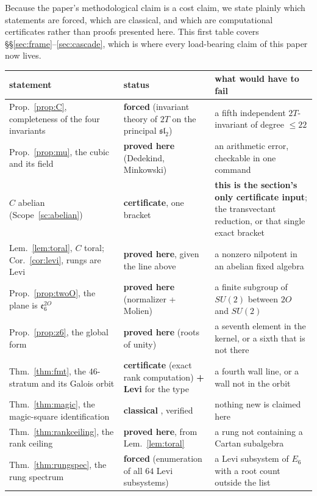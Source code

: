 \documentclass[11pt,reqno]{amsart}
\theoremstyle{plain}
\theoremstyle{definition}
\theoremstyle{remark}
\newcommand{\sll}{\mathfrak{sl}}
\newcommand{\ee}{\mathfrak{e}}
\begin{document}
Because the paper's methodological claim is a cost claim, we state plainly which
statements are forced, which are classical, and which are computational certificates
rather than proofs presented here. This first table covers
\S\S\ref{sec:frame}--\ref{sec:cascade}, which is where every load-bearing claim of
this paper now lives.

\begin{table}[h]
\centering\small
\begin{tabular}{@{}p{}p{}p{}@{}}
\toprule
statement & status & what would have to fail\\
\midrule
Prop.~\ref{prop:C}, completeness of the four invariants
 & \textbf{forced} (invariant theory of $2T$ on the principal $\sll_2$)
 & a fifth independent $2T$-invariant of degree $\le22$\\
Prop.~\ref{prop:mu}, the cubic and its field
 & \textbf{proved here} (Dedekind, Minkowski)
 & an arithmetic error, checkable in one command\\
$C$ abelian (Scope~\ref{sc:abelian})
 & \textbf{certificate}, one bracket
 & \textbf{this is the section's only certificate input}; the
   transvectant reduction, or that single exact bracket\\
Lem.~\ref{lem:toral}, $C$ toral; Cor.~\ref{cor:levi}, rungs are Levi
 & \textbf{proved here}, given the line above
 & a nonzero nilpotent in an abelian fixed algebra\\
Prop.~\ref{prop:twoO}, the plane is $\ee_6^{2O}$
 & \textbf{proved here} (normalizer + Molien)
 & a finite subgroup of $SU(2)$ between $2O$ and $SU(2)$\\
Prop.~\ref{prop:z6}, the global form
 & \textbf{proved here} (roots of unity)
 & a seventh element in the kernel, or a sixth that is not there\\
Thm.~\ref{thm:fmt}, the $46$-stratum and its Galois orbit
 & \textbf{certificate} (exact rank computation) \textbf{+ Levi} for the type
 & a fourth wall line, or a wall not in the orbit\\
Thm.~\ref{thm:magic}, the magic-square identification
 & \textbf{classical} \cite{BartonSudbery}, verified
 & nothing new is claimed here\\
Thm.~\ref{thm:rankceiling}, the rank ceiling
 & \textbf{proved here}, from Lem.~\ref{lem:toral}
 & a rung not containing a Cartan subalgebra\\
Thm.~\ref{thm:rungspec}, the rung spectrum
 & \textbf{forced} (enumeration of all $64$ Levi subsystems)
 & a Levi subsystem of $E_6$ with a root count outside the list\\

\end{tabular}
\end{table}
\end{document}
